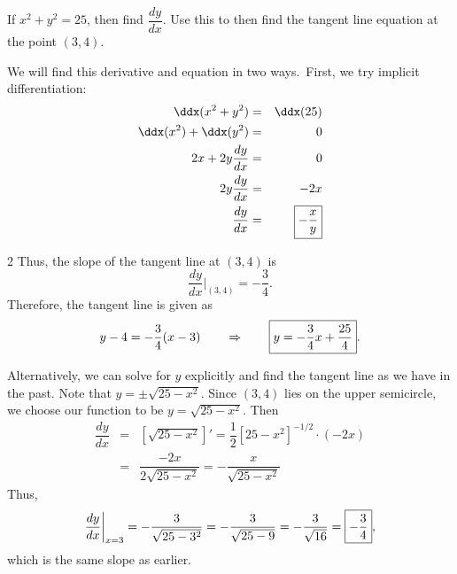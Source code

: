 \documentclass{book}
\begin{document}
\begin{Exam} If $x^2+y^2=25$, then find $\dfrac{dy}{dx}$. Use this to then find the tangent line equation at the point $(3,4)$.

We will find this derivative and equation in two ways.\footnotemark\  First, we try implicit differentiation:
\begin{eqnarray*}
\ddx(x^2+y^2) &=& \ddx(25)\\
\ddx(x^2) + \ddx(y^2) &=& 0\\
2x + 2y\dfrac{dy}{dx} &=& 0\\
2y\dfrac{dy}{dx} &=& -2x\\
\dfrac{dy}{dx} &=& \fbox{$-\dfrac{x}{y}$}
\end{eqnarray*} 
\begin{multicols}{2}
Thus, the slope of the tangent line at $(3,4)$ is 
\[\dfrac{dy}{dx}\bigg\vert_{(3,4)} = -\dfrac{3}{4}.\] Therefore, the tangent line is given as 
\[y-4 = -\dfrac{3}{4}(x-3) \qquad \Rightarrow \qquad \fbox{$y=-\dfrac{3}{4}x + \dfrac{25}{4}$}.\]\vfill
\begin{center}
\end{center}
\end{multicols}

Alternatively, we can solve for $y$ explicitly and find the tangent line as we have in the past. Note that $y=\pm\sqrt{25-x^2}$. Since $(3,4)$ lies on the upper semicircle, we choose our function to be $y = \sqrt{25-x^2}$. Then
\begin{eqnarray*}
\dfrac{dy}{dx} &=& \left[\sqrt{25-x^2}\right]' = \dfrac{1}{2}\left[25-x^2\right]^{-1/2}\cdot (-2x)\\
&=& \dfrac{-2x}{2\sqrt{25-x^2}} = -\dfrac{x}{\sqrt{25-x^2}}
\end{eqnarray*} Thus, 
\[\dfrac{dy}{dx}\bigg|_{x=3} = -\dfrac{3}{\sqrt{25-3^2}} = -\dfrac{3}{\sqrt{25-9}} = - \dfrac{3}{\sqrt{16}} = \fbox{$-\dfrac{ 3}{4}$},\] which is the same slope as earlier.
\end{Exam}\vs 
\end{document}
